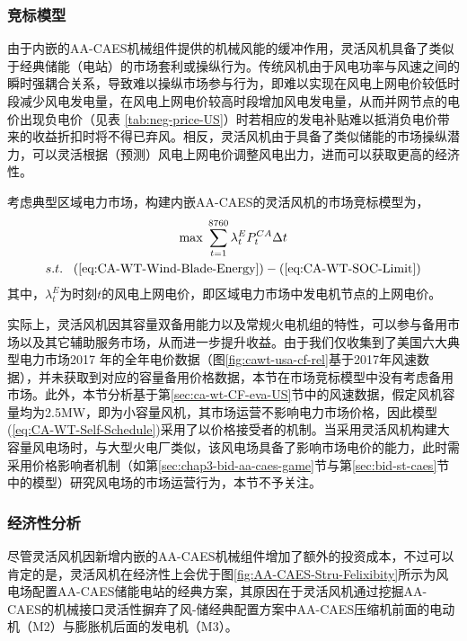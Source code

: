 \subsubsection{竞标模型}
由于内嵌的AA-CAES机械组件提供的机械风能的缓冲作用，灵活风机具备了类似于经典储能（电站）的市场套利或操纵行为。传统风机由于风电功率与风速之间的瞬时强耦合关系，导致难以操纵市场参与行为，即难以实现在风电上网电价较低时段减少风电发电量，在风电上网电价较高时段增加风电发电量，从而并网节点的电价出现负电价（见表
\ref{tab:neg-price-US}）时若相应的发电补贴难以抵消负电价带来的收益折扣时将不得已弃风。相反，灵活风机由于具备了类似储能的市场操纵潜力，可以灵活根据（预测）风电上网电价调整风电出力，进而可以获取更高的经济性。

考虑典型区域电力市场，构建内嵌AA-CAES的灵活风机的市场竞标模型为，
\begin{subequations}
\label{eq:CA-WT-Self-Schedule}
\begin{gather}
\max \;\sum\limits_{t = 1}^{8760} {\lambda _t^EP_t^{CA}\Delta t} \label{eq:CA-WT-Self-Schedule-obj}\\
s.t.\;\;\;(\ref{eq:CA-WT-Wind-Blade-Energy}) - (\ref{eq:CA-WT-SOC-Limit})
\end{gather}
\end{subequations}
其中，$\lambda_t^E$为时刻$t$的风电上网电价，即区域电力市场中发电机节点的上网电价。

实际上，灵活风机因其容量双备用能力以及常规火电机组的特性，可以参与备用市场以及其它辅助服务市场，从而进一步提升收益。由于我们仅收集到了美国六大典型电力市场2017 年的全年电价数据（图\ref{fig:cawt-usa-cf-rel}基于2017年风速数据），并未获取到对应的容量备用价格数据，本节在市场竞标模型中没有考虑备用市场。此外，本节分析基于第\ref{sec:ca-wt-CF-eva-US}节中的风速数据，假定风机容量均为2.5MW，即为小容量风机，其市场运营不影响电力市场价格，因此模型(\ref{eq:CA-WT-Self-Schedule})采用了以价格接受者的机制。当采用灵活风机构建大容量风电场时，与大型火电厂类似，该风电场具备了影响市场电价的能力，此时需采用价格影响者机制（如第\ref{sec:chap3-bid-aa-caes-game}节与第\ref{sec:bid-st-caes}节中的模型）研究风电场的市场运营行为，本节不予关注。

\subsubsection{经济性分析}
尽管灵活风机因新增内嵌的AA-CAES机械组件增加了额外的投资成本，不过可以肯定的是，灵活风机在经济性上会优于图\ref{fig:AA-CAES-Stru-Felixibity}所示为风电场配置AA-CAES储能电站的经典方案，其原因在于灵活风机通过挖掘AA-CAES的机械接口灵活性摒弃了风-储经典配置方案中AA-CAES压缩机前面的电动机（M2）与膨胀机后面的发电机（M3）。

